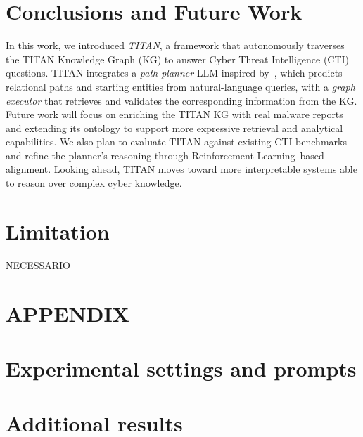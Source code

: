 \documentclass[11pt]{article}
\begin{document}
\section{Conclusions and Future Work}
\label{sec:conclusions}
In this work, we introduced \textit{TITAN}, a framework that autonomously traverses the TITAN Knowledge Graph (KG) to answer Cyber Threat Intelligence (CTI) questions.
TITAN integrates a \textit{path planner} LLM inspired by~\cite{rog}, which predicts relational paths and starting entities from natural-language queries, with a \textit{graph executor} that retrieves and validates the corresponding information from the KG. Future work will focus on enriching the TITAN KG with real malware reports and extending its ontology to support more expressive retrieval and analytical capabilities. We also plan to evaluate TITAN against existing CTI benchmarks and refine the planner’s reasoning through Reinforcement Learning–based alignment. Looking ahead, TITAN moves toward more interpretable systems able to reason over complex cyber knowledge. 

\section{Limitation}
NECESSARIO


\section*{APPENDIX}
\section{Experimental settings and prompts}
\section{Additional results}
\end{document}

